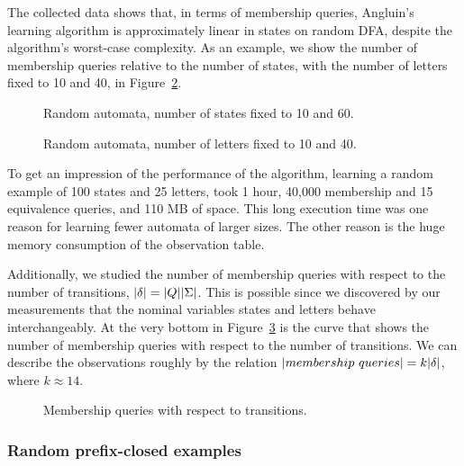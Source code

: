 The collected data shows that, in terms of membership queries,
Angluin's learning algorithm is approximately linear in states on
random DFA, despite the algorithm's worst-case complexity. As an
example, we show the number of membership queries relative to the
number of states, with the number of letters fixed to 10 and 40, in
Figure~\ref{fig:pic}.

\begin{figure}
  \begin{center}
    \caption{Random automata, number of states fixed to 10 and 60.\label{fig:pic_letter}}
  \end{center}
\end{figure}


\begin{figure}
  \begin{center} 
  \caption{Random automata, number of letters fixed to 10 and
  40.\label{fig:pic}} \end{center}
\end{figure}

To get an impression of the performance of the algorithm, learning a
random example of 100 states and 25 letters, took 1 hour, 40,000
membership and 15 equivalence queries, and 110 MB of space. This long
execution time was one reason for learning fewer automata of larger
sizes. The other reason is the huge memory consumption of the
observation table.

Additionally, we studied the number of membership queries with respect
to the number of transitions, $|\delta| = |Q||\Sigma|$. This
is possible since we discovered by our measurements that the nominal
variables states and letters behave interchangeably. At the very
bottom in Figure~\ref{fig:games_talk} is the curve that shows the
number of membership queries with respect to the number of
transitions. We can describe the observations roughly by the relation
$|membership~ queries| = k |\delta|$, where $k \approx 14$.

\begin{figure}
  \begin{center}
    \caption{Membership queries with respect to transitions.\label{fig:games_talk}}
  \end{center}
\end{figure}

\subsubsection{Random prefix-closed examples}

